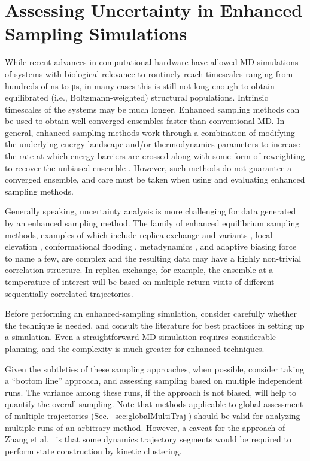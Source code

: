 \section{Assessing Uncertainty in Enhanced Sampling Simulations}
\label{sec:enhanced}

While recent advances in computational hardware have allowed MD simulations of systems with biological relevance to routinely reach timescales ranging from hundreds of \si{\nano\second} to \si{\micro\second}, in many cases this is still not long enough to obtain equilibrated (i.e., Boltzmann-weighted) structural populations.  Intrinsic timescales of the systems may be much longer.
Enhanced sampling methods can be used to obtain well-converged ensembles faster than conventional MD. In general, enhanced sampling methods work through a combination of modifying the underlying energy landscape and/or thermodynamics parameters to increase the rate at which energy barriers are crossed along with some form of reweighting to recover the unbiased ensemble \cite{Zuckerman2011}. However, such methods do not guarantee a converged ensemble, and care must be taken when using and evaluating enhanced sampling methods.

Generally speaking, uncertainty analysis is more challenging for data generated by an enhanced sampling method.
The family of enhanced equilibrium sampling methods, examples of which include replica exchange and variants \cite{Swendsen-1986,Sugita1999,Okamoto-2000}, local elevation \cite{Huber1994}, conformational flooding \cite{Grubmueller1995}, metadynamics \cite{Bussi2006a,Laio2008}, and adaptive biasing force \cite{Darve2001,Darve2008,Comer2015} to name a few, are complex and the resulting data may have a highly non-trivial correlation structure.
In replica exchange, for example, the ensemble at a temperature of interest will be based on multiple return visits of different sequentially correlated trajectories.

Before performing an enhanced-sampling simulation, consider carefully whether the technique is needed, and consult the literature for best practices in setting up a simulation.
Even a straightforward MD simulation requires considerable planning, and the complexity is much greater for enhanced techniques.

Given the subtleties of these sampling approaches, when possible, consider taking a ``bottom line'' approach, and assessing sampling based on multiple independent runs.
The variance among these runs, if the approach is not biased, will help to quantify the overall sampling.
Note that methods applicable to global assessment of multiple trajectories (Sec.\ \ref{sec:globalMultiTraj}) should be valid for analyzing multiple runs of an arbitrary method.
However, a caveat for the approach of Zhang et al.\ \cite{Zhang2010} is that some dynamics trajectory segments would be required to perform state construction by kinetic clustering.

